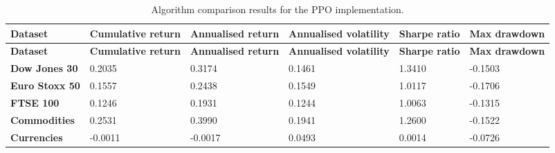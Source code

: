 \begin{longtable}{|l|p{2.1cm}|p{2.1cm}|p{2.1cm}|p{1.5cm}|p{2cm}|}
    \caption{Algorithm comparison results for the PPO implementation.}
    \label{tab:experiment_algorithms_ppo}
    \\ 
    \hline
    \textbf{Dataset} & \textbf{Cumulative return} & \textbf{Annualised return} & \textbf{Annualised volatility} & \textbf{Sharpe ratio} & \textbf{Max drawdown}  \\ \midrule
    \endfirsthead

    \hline
    \textbf{Dataset} & \textbf{Cumulative return} & \textbf{Annualised return} & \textbf{Annualised volatility} & \textbf{Sharpe ratio} & \textbf{Max drawdown}  \\ \midrule
    \endhead

    \endfoot
    \hline

    \textbf{Dow Jones 30} & 0.2035 & 0.3174 & 0.1461 & 1.3410 & -0.1503 \\ \hline
    \textbf{Euro Stoxx 50} & 0.1557 & 0.2438 & 0.1549 & 1.0117 & -0.1706 \\ \hline
    \textbf{FTSE 100} & 0.1246 & 0.1931 & 0.1244 & 1.0063 & -0.1315 \\ \hline
    \textbf{Commodities} & 0.2531 & 0.3990 & 0.1941 & 1.2600 & -0.1522 \\ \hline
    \textbf{Currencies} & -0.0011 & -0.0017 & 0.0493 & 0.0014 & -0.0726 \\ \hline
\end{longtable}